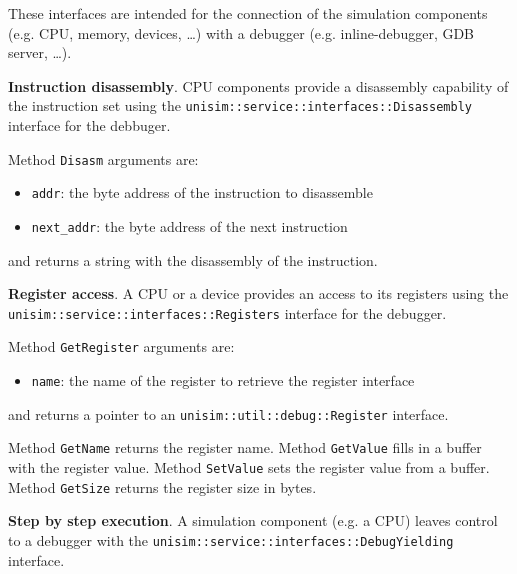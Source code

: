These interfaces are intended for the connection of the simulation components (e.g. CPU, memory, devices, \ldots) with a debugger (e.g. inline-debugger, GDB server, \ldots).

\textbf{Instruction disassembly}. CPU components provide a disassembly capability of the instruction set using the \texttt{unisim::service::interfaces::Disassembly} interface for the debbuger.

\begin{center}
	
\end{center}

\noindent Method \texttt{Disasm} arguments are:
\begin{itemize}
\item \texttt{addr}: the byte address of the instruction to disassemble
\item \texttt{next\_addr}: the byte address of the next instruction
\end{itemize}
\noindent and returns a string with the disassembly of the instruction.

\textbf{Register access}. A CPU or a device provides an access to its registers using the \texttt{unisim::service::interfaces::Registers} interface for the debugger.

\begin{center}
	
\end{center}

\noindent Method \texttt{GetRegister} arguments are:
\begin{itemize}
\item \texttt{name}: the name of the register to retrieve the register interface
\end{itemize}
\noindent and returns a pointer to an \texttt{unisim::util::debug::Register} interface.

\begin{center}
	
\end{center}

\noindent Method \texttt{GetName} returns the register name.
\noindent Method \texttt{GetValue} fills in a buffer with the register value.
\noindent Method \texttt{SetValue} sets the register value from a buffer.
\noindent Method \texttt{GetSize} returns the register size in bytes.

\textbf{Step by step execution}. A simulation component (e.g. a CPU) leaves control to a debugger with the \texttt{unisim::service::interfaces::DebugYielding} interface.

